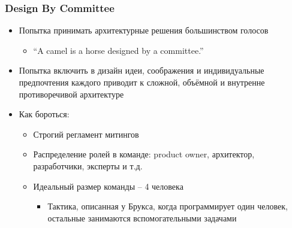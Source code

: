 \documentclass[xetex,mathserif,serif]{beamer}
\begin{document}
	\begin{frame}
		\frametitle{Design By Committee}
		\begin{itemize}
			\item Попытка принимать архитектурные решения большинством голосов
			\begin{itemize}
				\item ``A camel is a horse designed by a committee.''
			\end{itemize}
			\item Попытка включить в дизайн идеи, соображения и индивидуальные предпочтения каждого приводит к сложной, объёмной и внутренне противоречивой архитектуре
			\item Как бороться:
			\begin{itemize}
				\item Строгий регламент митингов
				\item Распределение ролей в команде: product owner, архитектор, разработчики, эксперты и т.д.
				\item Идеальный размер команды – 4 человека
				\begin{itemize}
					\item Тактика, описанная у Брукса, когда программирует один человек, остальные занимаются вспомогательными задачами
				\end{itemize}
			\end{itemize}
		\end{itemize}
	\end{frame}
\end{document}
